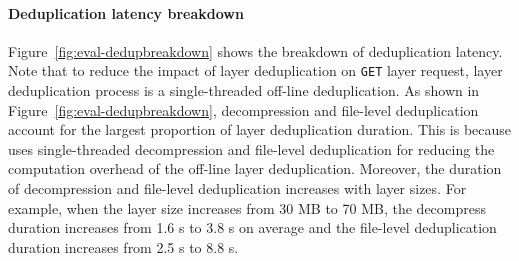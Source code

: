\paragraph{Deduplication latency breakdown}
Figure~\ref{fig:eval-dedupbreakdown}
shows the breakdown of deduplication latency.
Note that to reduce the impact of layer deduplication on
\texttt{GET} layer request,
 layer deduplication process is a 
single-threaded off-line deduplication.
As shown in Figure~\ref{fig:eval-dedupbreakdown},
decompression and file-level deduplication
account for the largest proportion of layer deduplication duration.
This is because \sysname uses single-threaded decompression
and file-level deduplication for reducing the computation overhead of the off-line layer deduplication.
Moreover, the duration of decompression and file-level deduplication
increases with layer sizes.
For example,
when the layer size increases from 30 MB to 70 MB,
the decompress duration increases from 1.6 s to 3.8 s on average
and the file-level deduplication duration increases from 2.5 s to 8.8 s.


